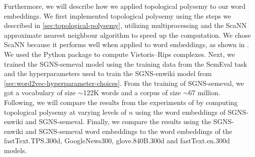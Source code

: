Furthermore, we will describe how we applied topological polysemy to our word embeddings. We first implemented topological polysemy using the steps we described in \cref{sec:topological-polysemy}, utilizing multiprocessing and the ScaNN \cite{scann2020} approximate nearest neighbour algorithm to speed up the computation. We chose ScaNN because it performs well when applied to word embeddings, as shown in \cite{AnnBenchmarks2021}. We used the  \cite{ctralie2018ripser} Python package to compute Vietoris–Rips complexes. Next, we trained the SGNS-semeval model using the training data from the SemEval task and the hyperparameters used to train the SGNS-enwiki model from \cref{sec:word2vec-hyperparameter-choices}. From the training of SGNS-semeval, we got a vocabulary of size $\sim$122K words and a corpus of size $\sim$67 million. Following, we will compare the results from the experiments of \cite{jakubowski2020topology} by computing topological polysemy at varying levels of $n$ using the word embeddings of SGNS-enwiki and SGNS-semeval. Finally, we compare the results using the SGNS-enwiki and SGNS-semeval word embeddings to the word embeddings of the fastText.TPS.300d, GoogleNews300, glove.840B.300d and fastText.en.300d models.


